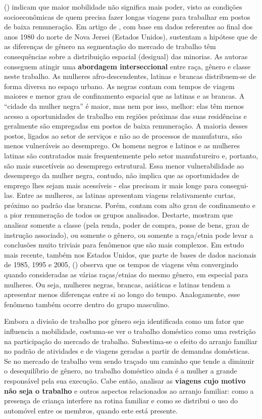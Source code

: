  (\citeyear{LAFFERTY1991}) indicam que maior mobilidade não significa mais poder, visto as condições socioeconômicas de quem precisa fazer longas viagens para trabalhar em postos de baixa remuneração. Em artigo de \citeyear{LAFFERTY1992}, com base em dados referentes ao final dos anos 1980 do norte de Nova Jersei (Estados Unidos),  sustentam a hipótese que de as diferenças de gênero na segmentação do mercado de trabalho têm consequências sobre a distribuição espacial (desigual) das minorias. As autoras conseguem atingir uma \textbf{abordagem interseccional} entre raça, gênero e classe neste trabalho. As mulheres afro-descendentes, latinas e brancas distribuem-se de forma diversa no espaço urbano. As negras contam com tempos de viagem maiores e menor grau de confinamento espacial que as latinas e as brancas. A ``cidade da mulher negra'' é maior, mas nem por isso, melhor: elas têm menos acesso a oportunidades de trabalho em regiões próximas das suas residências e geralmente são empregadas em postos de baixa remuneração. A maioria desses postos, ligados ao setor de serviços e não ao de processos de manufatura, são menos vulneráveis ao desemprego. Os homens negros e latinos e as mulheres latinas são contratados mais frequentemente pelo setor manufatureiro e, portanto, são mais suscetíveis ao desemprego estrutural. Essa menor vulnerabilidade ao desemprego da mulher negra, contudo, não implica que as oportunidades de emprego lhes sejam mais acessíveis - elas precisam ir mais longe para consegui-las. Entre as mulheres, as latinas apresentam viagens relativamente curtas, próximo ao padrão das brancas. Porém, contam com alto grau de confinamento e a pior remuneração de todos os grupos analisados. Destarte,  mostram que analisar somente a classe (pela renda, poder de compra, posse de bens, grau de instrução associado), ou somente o gênero, ou somente a raça/etnia pode levar a conclusões muito triviais para fenômenos que são mais complexos. Em estudo mais recente, também nos Estados Unidos, que parte de bases de dados nacionais de 1985, 1995 e 2005,  (\citeyear{CRANE2007}) observa que os tempos de viagens vêm convergindo quando consideradas as várias raças/etnias do mesmo gênero, em especial para mulheres. Ou seja, mulheres negras, brancas, asiáticas e latinas tendem a apresentar menos diferenças entre si ao longo do tempo. Analogamente, esse fenômeno também ocorre dentro do grupo masculino.


Embora a divisão de trabalho por gênero seja identificada como um fator que influencia a mobilidade, costuma-se ver o trabalho doméstico como uma restrição na participação do mercado de trabalho.
Subestima-se o efeito do arranjo familiar no padrão de atividades e de viagens geradas a partir de demandas domésticas.
Se no mercado de trabalho vem sendo traçado um caminho que tende a diminuir o desequilíbrio de gênero, no trabalho doméstico ainda é a mulher a grande responsável pela sua execução.
Cabe então, analisar as \textbf{viagens cujo motivo não seja o trabalho} e outros aspectos relacionados ao arranjo familiar: como a presença de criança interfere na rotina familiar e como se distribui o uso do automóvel entre os membros, quando este está presente.


